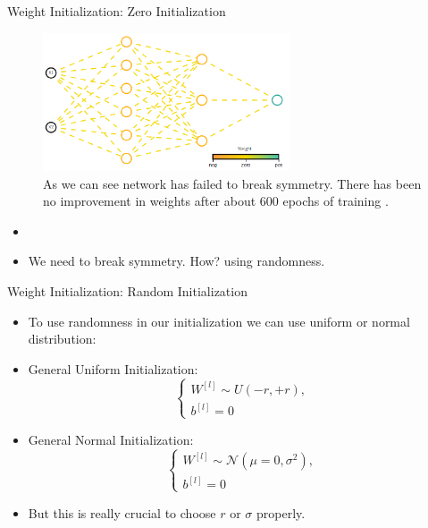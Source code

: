 \begin{frame}{Weight Initialization: Zero Initialization}
	\begin{figure}[H]
		\centering
		\includegraphics[width=0.65\textwidth]{Images/zero-init.png}
		\caption{As we can see network has failed to break symmetry. There has been no improvement in weights after about 600 epochs of training \cite{katanforoosh-kunin}.}
	\end{figure}
	\begin{itemize}
		\item[]
		\item We need to break symmetry. How? using randomness.
	\end{itemize}
\end{frame}

\begin{frame}{Weight Initialization: Random Initialization}
	\begin{itemize}
		\item To use randomness in our initialization we can use uniform or normal distribution:
		\medskip
		\item[]\begin{block}{General Uniform Initialization:}
			\[
			\begin{cases}
				W^{[l]} \sim U(-r, +r),\\
				b^{[l]} = 0
			\end{cases}
			\]
		\end{block}
		\item[]\begin{block}{General Normal Initialization:}
			\[
			\begin{cases}
				W^{[l]} \sim \mathcal{N}(\mu=0, \sigma^2),\\
				b^{[l]} = 0
			\end{cases}
			\]
		\end{block}
		\medskip
		\item But this is really crucial to choose $r$ or $\sigma$ properly.
	\end{itemize}
\end{frame}

